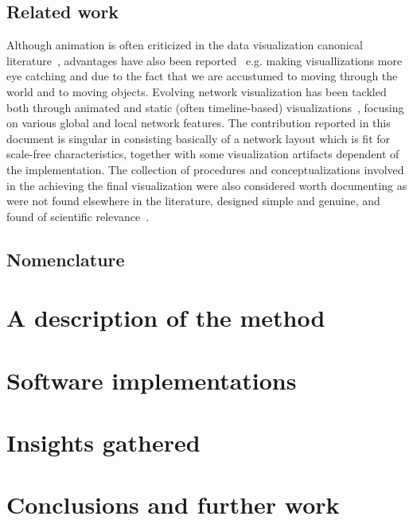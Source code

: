\documentclass[runningheads]{llncs}
\begin{document}
\subsection{Related work}
Although animation is often criticized in the data visualization canonical literature~\cite{munzner,ware}, advantages have also been reported~\cite{cog,anim} e.g. making visuallizations more eye catching and due to the fact that we are accustumed to moving through the world and to moving objects.
Evolving network visualization has been tackled both through animated and static (often timeline-based) visualizations~\cite{ego,brain,visAn}, focusing on various global and local network features.
The contribution reported in this document is singular in consisting basically of a network layout which is fit for scale-free characteristics, together with some visualization artifacts dependent of the implementation.
The collection of procedures and conceptualizations involved in the achieving the final visualization were also considered worth documenting as were not found elsewhere in the literature, designed simple and genuine, and found of scientific relevance~\cite{stab}.

\subsection{Nomenclature}

\section{A description of the method}
\section{Software implementations}
\section{Insights gathered}
\section{Conclusions and further work}
%
%
%


%
% 
% 
% 
% 
\end{document}
